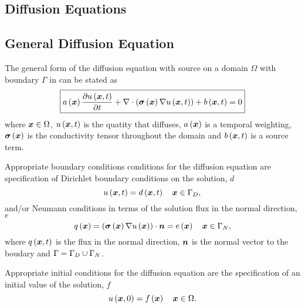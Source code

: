 \subsection{Diffusion Equations} 

\subsection{General Diffusion Equation} 


The general form of the diffusion equation with source on a domain $\Omega$ with boundary
$\Gamma$ in \OpenCMISS can be stated as
\begin{equation}
  \boxed{
    \fnof{a}{\vect{x}}\delby{\fnof{u}{\vect{x},t}}{t}+
    \divergence{}{\pbrac{\fnof{\tensor{\sigma}}{\vect{x}}\gradient{}{\fnof{u}{\vect{x},t}}}}+
    \fnof{b}{\vect{x},t}=0  
  }
  \label{eqn:diffusionequation}
\end{equation}
where $\vect{x}\in\Omega$, $\fnof{u}{\vect{x},t}$ is the quatity that diffuses,
$\fnof{a}{\vect{x}}$ is a temporal weighting, $\fnof{\tensor{\sigma}}{\vect{x}}$ is
the conductivity tensor throughout the domain and $\fnof{b}{\vect{x},t}$ is a
source term.

Appropriate boundary conditions conditions for the diffusion
equation are specification of Dirichlet boundary conditions on the solution,
$d$ \ie
\begin{equation}
  \fnof{u}{\vect{x},t} = \fnof{d}{\vect{x},t} \quad \vect{x}\in\Gamma_{D},
  \label{eqn:diffusionDirichletBC} 
\end{equation}
and/or Neumann conditions in terms of the solution flux in the normal
direction, $e$ \ie
\begin{equation}
  \fnof{q}{\vect{x}} = \dotprod{\pbrac{\fnof{\tensor{\sigma}}{\vect{x}}
      \gradient{}{\fnof{u}{\vect{x}}}}}{\normal} =
  \fnof{e}{\vect{x}} \quad \vect{x}\in\Gamma_{N},
  \label{eqn:diffusionNeumannBC} 
\end{equation}
where $\fnof{q}{\vect{x},t}$ is the flux in the normal direction, $\boldsymbol{n}$ is the normal
vector to the boudary and $\Gamma=\Gamma_{D}\cup\Gamma_{N}$.

Appropriate initial conditions for the diffusion equation are the
specification of an initial value of the solution, $f$ \ie
\begin{equation}
  \fnof{u}{\vect{x},0} = \fnof{f}{\vect{x}} \quad \vect{x}\in\Omega.
  \label{eqn:diffusionInitialC} 
\end{equation}

